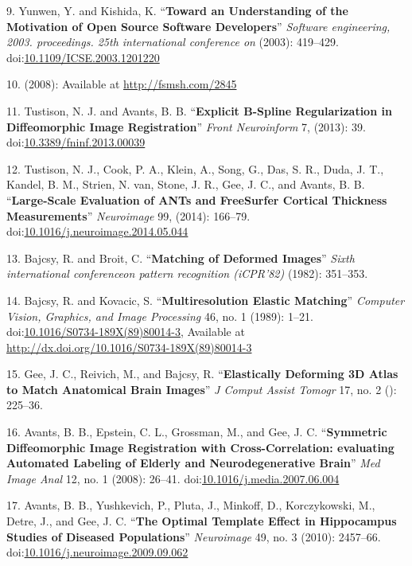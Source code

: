 \documentclass[11pt,]{article}
\begin{document}
9. Yunwen, Y. and Kishida, K. ``\textbf{Toward an Understanding of the
Motivation of Open Source Software Developers}'' \emph{Software
engineering, 2003. proceedings. 25th international conference on}
(2003): 419--429.
doi:\href{http://dx.doi.org/10.1109/ICSE.2003.1201220}{10.1109/ICSE.2003.1201220}

10. (2008): Available at \url{http://fsmsh.com/2845}

11. Tustison, N. J. and Avants, B. B. ``\textbf{Explicit B-Spline
Regularization in Diffeomorphic Image Registration}'' \emph{Front
Neuroinform} 7, (2013): 39.
doi:\href{http://dx.doi.org/10.3389/fninf.2013.00039}{10.3389/fninf.2013.00039}

12. Tustison, N. J., Cook, P. A., Klein, A., Song, G., Das, S. R., Duda,
J. T., Kandel, B. M., Strien, N. van, Stone, J. R., Gee, J. C., and
Avants, B. B. ``\textbf{Large-Scale Evaluation of ANTs and FreeSurfer
Cortical Thickness Measurements}'' \emph{Neuroimage} 99, (2014):
166--79.
doi:\href{http://dx.doi.org/10.1016/j.neuroimage.2014.05.044}{10.1016/j.neuroimage.2014.05.044}

13. Bajcsy, R. and Broit, C. ``\textbf{Matching of Deformed Images}''
\emph{Sixth international conferenceon pattern recognition (iCPR'82)}
(1982): 351--353.

14. Bajcsy, R. and Kovacic, S. ``\textbf{Multiresolution Elastic
Matching}'' \emph{Computer Vision, Graphics, and Image Processing} 46,
no. 1 (1989): 1--21.
doi:\href{http://dx.doi.org/10.1016/S0734-189X(89)80014-3}{10.1016/S0734-189X(89)80014-3},
Available at \url{http://dx.doi.org/10.1016/S0734-189X(89)80014-3}

15. Gee, J. C., Reivich, M., and Bajcsy, R. ``\textbf{Elastically
Deforming 3D Atlas to Match Anatomical Brain Images}'' \emph{J Comput
Assist Tomogr} 17, no. 2 (): 225--36.

16. Avants, B. B., Epstein, C. L., Grossman, M., and Gee, J. C.
``\textbf{Symmetric Diffeomorphic Image Registration with
Cross-Correlation: evaluating Automated Labeling of Elderly and
Neurodegenerative Brain}'' \emph{Med Image Anal} 12, no. 1 (2008):
26--41.
doi:\href{http://dx.doi.org/10.1016/j.media.2007.06.004}{10.1016/j.media.2007.06.004}

17. Avants, B. B., Yushkevich, P., Pluta, J., Minkoff, D., Korczykowski,
M., Detre, J., and Gee, J. C. ``\textbf{The Optimal Template Effect in
Hippocampus Studies of Diseased Populations}'' \emph{Neuroimage} 49, no.
3 (2010): 2457--66.
doi:\href{http://dx.doi.org/10.1016/j.neuroimage.2009.09.062}{10.1016/j.neuroimage.2009.09.062}
\end{document}
